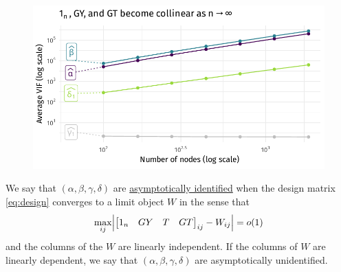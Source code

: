 \documentclass[aspectratio=169]{beamer}
\theoremstyle{remark}
\begin{document}
\begin{frame}
    \begin{figure}
        \centering
        \includegraphics{figures/simulations/defense-vif.pdf}
    \end{figure}
\end{frame}

\begin{frame}

    \begin{definition}
        We say that $(\alpha, \beta, \gamma, \delta)$ are \underline{asymptotically identified} when the design matrix \eqref{eq:design} converges to a limit object $W$ in the sense that
        \begin{equation*}
            \max_{ij} \abs*{
            \begin{bmatrix} 1_n & GY & T & GT \end{bmatrix}_{ij} - W_{ij}
            } = o(1)
        \end{equation*}
        and the columns of the $W$ are linearly independent. If the columns of $W$ are linearly dependent, we say that $(\alpha, \beta, \gamma, \delta)$ are asymptotically unidentified.
    \end{definition}
\end{frame}
\end{document}
